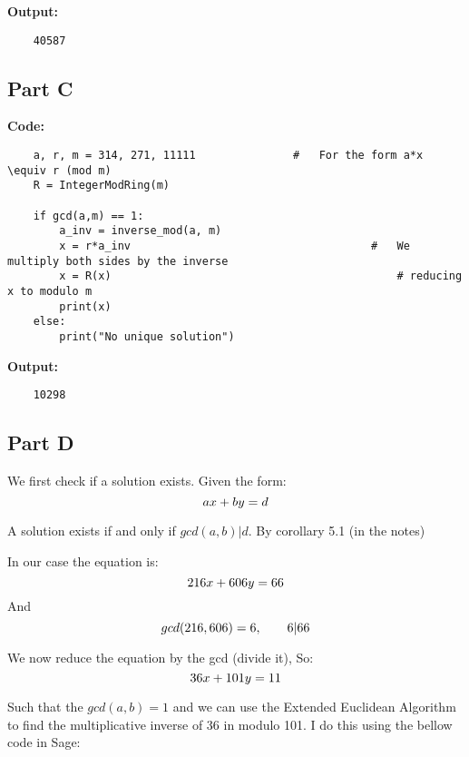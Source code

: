 \documentclass{article}
\numberwithin{equation}{subsection}
\begin{document}
\textbf{Output:}

\begin{lstlisting}
	40587	
\end{lstlisting}


\vspace{25pt}

\subsection*{Part C}

\vspace{10pt}
\textbf{Code:}

\begin{lstlisting}
	a, r, m = 314, 271, 11111				#	For the form a*x \equiv r (mod m)
	R = IntegerModRing(m)

	if gcd(a,m) == 1:
		a_inv = inverse_mod(a, m)
		x = r*a_inv										#	We multiply both sides by the inverse
		x = R(x)											# reducing x to modulo m
		print(x)
	else:
		print("No unique solution")
\end{lstlisting}

\textbf{Output:}
\begin{lstlisting}
	10298
\end{lstlisting}


\vspace{25pt}
\subsection*{Part D}
We first check if a solution exists. Given the form:
\begin{equation}\notag
	ax + by = d	
\end{equation}

A solution exists if and only if $gcd(a,b) | d$. By corollary 5.1 (in the notes)

In our case the equation is:
\begin{equation}\notag
	216x + 606y = 66	
\end{equation}
And 
\begin{equation}\notag
	gcd(216, 606) = 6, \qquad 6|66	
\end{equation}


We now reduce the equation by the gcd (divide it), So:
\begin{equation}\notag
	36x + 101y = 11	
\end{equation}

Such that the $gcd(a,b) = 1$ and we can use the Extended Euclidean Algorithm to find the multiplicative inverse of 
36 in modulo 101. I do this using the bellow code in Sage:
\end{document}
